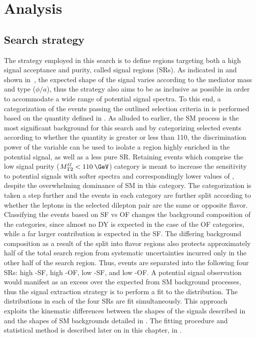 \chapter{Analysis}
\label{chap:analysis}

\section{Search strategy}
\label{sec:strategy}

The strategy employed in this search is to define regions targeting both a high signal acceptance and purity, called signal regions (SRs). As indicated in  and shown in~, the expected shape of the signal varies according to the mediator mass and type ($\phi/a$), thus the strategy also aims to be as inclusive as possible in order to accommodate a wide range of potential signal \MET spectra. To this end, a categorization of the events passing the outlined selection criteria in  is performed based on the \mttll quantity defined in . As alluded to earlier, the SM \ttll process is the most significant background for this search and by categorizing selected events according to whether the \mttll quantity is greater or less than 110\:\GeV, the discrimination power of the variable can be used to isolate a region highly enriched in the potential signal, as well as a less pure SR. Retaining events which comprise the low signal purity ($\mttll < 110\:\GeV$) category is meant to increase the sensitivity to potential signals with softer \MET spectra and correspondingly lower values of \mttll, despite the overwhelming dominance of SM \ttll in this category. The categorization is taken a step further and the events in each \mttll category are further split according to whether the leptons in the selected dilepton pair are the same or opposite flavor. Classifying the events based on SF vs OF changes the background composition of the categories, since almost no DY is expected in the case of the OF categories, while a far larger contribution is expected in the SF. The differing background composition as a result of the split into flavor regions also protects approximately half of the total search region from systematic uncertainties incurred only in the other half of the search region. Thus, events are separated into the following four SRs: high \mttll-SF, high \mttll-OF, low \mttll-SF, and low \mttll-OF. A potential signal observation would manifest as an excess over the expected \ptmiss from SM background processes, thus the signal extraction strategy is to perform a fit to the \ptmiss distribution. The \ptmiss distributions in each of the four SRs are fit simultaneously. This approach exploits the kinematic differences between the \ptmiss shapes of the \ttDM signals described in  and the \ptmiss shapes of SM backgrounds detailed in . The fitting procedure and statistical method is described later on in this chapter, in .

